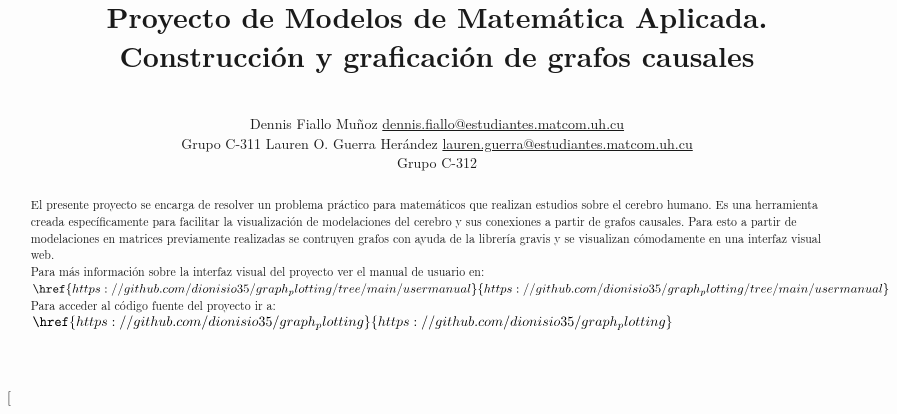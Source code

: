 \documentclass[a4paper,10pt,twocolumn]{article}
\title{Proyecto de Modelos de Matemática Aplicada. \\Construcción y graficación de grafos causales}
\author{\\
\name Dennis Fiallo Muñoz \email \href{mailto: dennis.fiallo@estudiantes.matcom.uh.cu}{dennis.fiallo@estudiantes.matcom.uh.cu}
	\\ \addr Grupo C-311 \AND
\name Lauren O. Guerra Herández \email \href{mailto:lauren.guerra@estudiantes.matcom.uh.cu}{lauren.guerra@estudiantes.matcom.uh.cu}
  \\ \addr Grupo C-312}
\begin{document}
\twocolumn[

\maketitle


\begin{abstract}

El presente proyecto se encarga de resolver un problema práctico para matemáticos que realizan estudios sobre el cerebro humano. Es una herramienta creada específicamente para facilitar la visualización de modelaciones del cerebro y sus conexiones a partir de grafos causales. Para esto a partir de modelaciones en matrices previamente realizadas se contruyen grafos con ayuda de la librería gravis y se visualizan cómodamente en una interfaz visual web.\\
Para más información sobre la interfaz visual del proyecto ver el manual de usuario en: $\href{https://github.com/dionisio35/graph_plotting/tree/main/user manual}{https://github.com/dionisio35/graph_plotting/tree/main/user manual}$\\
Para acceder al código fuente del proyecto ir a: $\href{https://github.com/dionisio35/graph_plotting}{https://github.com/dionisio35/graph_plotting}$


\end{abstract}

\vspace{0.9cm}
\end{document}
